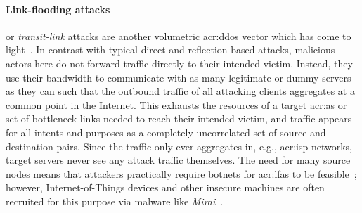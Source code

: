\paragraph{Link-flooding attacks}
 or \emph{transit-link} attacks are another volumetric \gls{acr:ddos} vector which has come to light~\parencite{DBLP:conf/esorics/StuderP09,DBLP:conf/sp/KangLG13}.
In contrast with typical direct and reflection-based attacks, malicious actors here do not forward traffic directly to their intended victim.
Instead, they use their bandwidth to communicate with as many legitimate or dummy servers as they can such that the outbound traffic of all attacking clients aggregates at a common point in the Internet.
This exhausts the resources of a target \gls{acr:as} or set of bottleneck links needed to reach their intended victim, and traffic appears for all intents and purposes as a completely uncorrelated set of source and destination pairs.
Since the traffic only ever aggregates in, e.g., \gls{acr:isp} networks, target servers never see any attack traffic themselves.
The need for many source nodes means that attackers practically require botnets for \glspl{acr:lfa} to be feasible~\parencite{DBLP:conf/sp/SmithS18}; however, Internet-of-Things devices and other insecure machines are often recruited for this purpose via malware like \emph{Mirai}~\parencite{DBLP:conf/uss/AntonakakisABBB17}.


